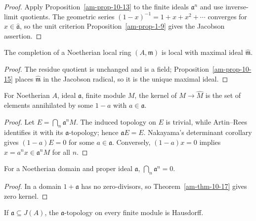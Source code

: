 \begin{proof}
Apply Proposition~\ref{am-prop-10-13} to the finite ideals $\mathfrak{a}^n$ and
use inverse-limit quotients.  The geometric series
$(1-x)^{-1}=1+x+x^2+\cdots$ converges for $x\in\widehat{\mathfrak{a}}$, so the
unit criterion Proposition~\ref{am-prop-1-9} gives the Jacobson assertion.
\end{proof}
\begin{proposition}
\label{am-prop-10-16}
\uses{}
The completion of a Noetherian local ring $(A,\mathfrak{m})$ is local with maximal ideal
$\widehat{\mathfrak{m}}$.
\end{proposition}
\begin{proof}
The residue quotient is unchanged and is a field; Proposition~\ref{am-prop-10-15}
places $\widehat{\mathfrak{m}}$ in the Jacobson radical, so it is the unique maximal ideal.
\end{proof}
\begin{theorem}
\label{am-thm-10-17}
\uses{}
For Noetherian $A$, ideal $\mathfrak{a}$, finite module $M$, the kernel of
$M\to\widehat M$ is the set of elements annihilated by some $1-a$ with
$a\in\mathfrak{a}$.
\end{theorem}
\begin{proof}
Let $E=\bigcap_n\mathfrak{a}^nM$.  The induced topology on $E$ is trivial, while
Artin--Rees identifies it with its $\mathfrak{a}$-topology; hence $\mathfrak{a} E=E$.
Nakayama's determinant corollary gives $(1-a)E=0$ for some $a\in\mathfrak{a}$.
Conversely, $(1-a)x=0$ implies $x=a^nx\in\mathfrak{a}^nM$ for all $n$.
\end{proof}
\begin{corollary}
\label{am-cor-10-18}
\uses{}
For a Noetherian domain and proper ideal $\mathfrak{a}$, $\bigcap_n\mathfrak{a}^n=0$.
\end{corollary}
\begin{proof}
In a domain $1+\mathfrak{a}$ has no zero-divisors, so Theorem~\ref{am-thm-10-17}
gives zero kernel.
\end{proof}
\begin{corollary}
\label{am-cor-10-19}
\uses{}
If $\mathfrak{a}\subseteq J(A)$, the $\mathfrak{a}$-topology on every finite module is
Hausdorff.
\end{corollary}
